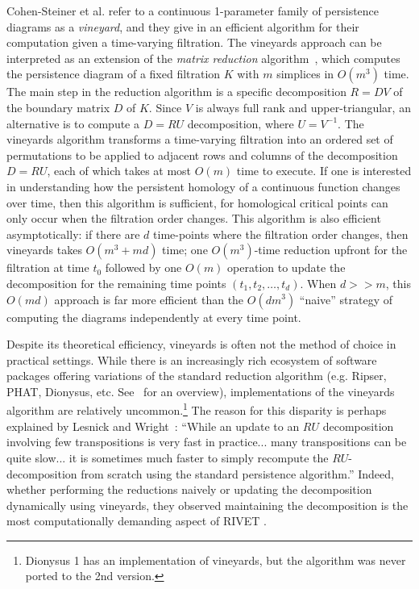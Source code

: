 \documentclass{siamart190516}
\begin{document}
Cohen-Steiner et al. refer to a continuous 1-parameter family of persistence diagrams as a \emph{vineyard}, and they give in \cite{cohen2006vines} an efficient algorithm for their computation given a time-varying filtration. 
The vineyards approach can be interpreted as an extension of the \emph{matrix reduction} algorithm~\cite{zomorodian2005computing}, which computes the persistence diagram of a fixed filtration $K$ with $m$ simplices in $O(m^3)$ time.
The main step in the reduction algorithm is a specific decomposition $R = D V$ of the boundary matrix $D$ of $K$. 
Since $V$ is always full rank and upper-triangular, an alternative is to compute a $D = RU$ decomposition, where $U = V^{-1}$. 
The vineyards algorithm transforms a time-varying filtration into an ordered set of permutations to be applied to adjacent rows and columns of the decomposition $D = RU$, each of which takes at most $O(m)$ time to execute. If one is interested in understanding how the persistent homology of a continuous function changes over time, then this algorithm is sufficient, for  homological critical points can only occur when the filtration order changes. 
This algorithm is also efficient  asymptotically: if there are $d$ time-points where the filtration order changes, then   vineyards   takes $O(m^3 + md)$ time; one $O(m^3)$-time reduction upfront for the filtration at time $t_0$ followed by one $O(m)$ operation to update the decomposition for the remaining time points $(t_1, t_2, \dots, t_d)$. When $d >> m$, this $O(md)$ approach is far more efficient than the $O(dm^3)$  ``naive'' strategy of computing the diagrams independently at every time point.

Despite its theoretical efficiency, vineyards is often not the method of choice in practical settings. 
While there is an increasingly rich ecosystem of software packages offering variations of the standard reduction algorithm (e.g. Ripser, PHAT, Dionysus, etc. See~\cite{otter2017roadmap} for an overview), implementations of the vineyards algorithm are relatively uncommon.\footnote{Dionysus 1 has an implementation of vineyards, but the algorithm was never ported to the 2nd version.} 
The reason for this disparity is perhaps explained by Lesnick and Wright~\cite{lesnick2015interactive}: ``While an update to an $RU$ decomposition involving few transpositions is very fast in practice... many transpositions can be quite slow... it is sometimes much faster to simply recompute the $RU$-decomposition from scratch using the standard persistence algorithm.'' Indeed, whether performing the reductions naively or updating the decomposition dynamically using vineyards, they observed maintaining the decomposition is the most computationally demanding aspect of RIVET \cite{rivet}.
\end{document}
